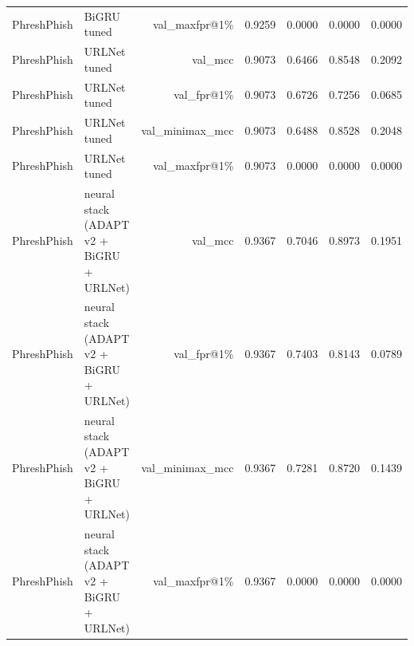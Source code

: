 \begin{table}[t]
\begin{tabular}{llrrrrr}
PhreshPhish & BiGRU tuned & val\_maxfpr@1\% & 0.9259 & 0.0000 & 0.0000 & 0.0000 \\
PhreshPhish & URLNet tuned & val\_mcc & 0.9073 & 0.6466 & 0.8548 & 0.2092 \\
PhreshPhish & URLNet tuned & val\_fpr@1\% & 0.9073 & 0.6726 & 0.7256 & 0.0685 \\
PhreshPhish & URLNet tuned & val\_minimax\_mcc & 0.9073 & 0.6488 & 0.8528 & 0.2048 \\
PhreshPhish & URLNet tuned & val\_maxfpr@1\% & 0.9073 & 0.0000 & 0.0000 & 0.0000 \\
PhreshPhish & neural stack (ADAPT v2 + BiGRU + URLNet) & val\_mcc & 0.9367 & 0.7046 & 0.8973 & 0.1951 \\
PhreshPhish & neural stack (ADAPT v2 + BiGRU + URLNet) & val\_fpr@1\% & 0.9367 & 0.7403 & 0.8143 & 0.0789 \\
PhreshPhish & neural stack (ADAPT v2 + BiGRU + URLNet) & val\_minimax\_mcc & 0.9367 & 0.7281 & 0.8720 & 0.1439 \\
PhreshPhish & neural stack (ADAPT v2 + BiGRU + URLNet) & val\_maxfpr@1\% & 0.9367 & 0.0000 & 0.0000 & 0.0000 \\
\bottomrule
\end{tabular}
\end{table}